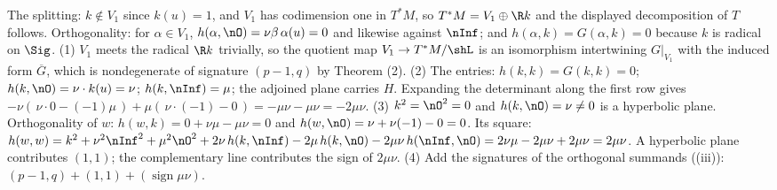 The splitting: $k \notin V_1$ since $k(u) = 1$, and $V_1$ has codimension one in $T^*M$, so $T^*M = V_1 \oplus \R k$ and the displayed decomposition of $T$ follows. Orthogonality: for $\alpha \in V_1$, $h(\alpha, \nO) = \nu\beta\,\alpha(u) = 0$ and likewise against $\nInf$; and $h(\alpha, k) = G(\alpha, k) = 0$ because $k$ is radical on $\Sig$. (1) $V_1$ meets the radical $\R k$ trivially, so the quotient map $V_1 \to T^*M/\shL$ is an isomorphism intertwining $G|_{V_1}$ with the induced form $\overline{G}$, which is nondegenerate of signature $(p{-}1,q)$ by Theorem (2). (2) The entries: $h(k,k) = G(k,k) = 0$; $h(k, \nO) = \nu \cdot k(u) = \nu$; $h(k, \nInf) = \mu$; the adjoined plane carries $H$. Expanding the determinant along the first row gives $-\nu(\,\nu \cdot 0 - (-1)\mu\,) + \mu(\,\nu \cdot (-1) - 0\,) = -\mu\nu - \mu\nu = -2\mu\nu$. (3) $k^2 = \nO^2 = 0$ and $h(k, \nO) = \nu \neq 0$ is a hyperbolic plane. Orthogonality of $w$: $h(w, k) = 0 + \nu\mu - \mu\nu = 0$ and $h(w, \nO) = \nu + \nu(-1) - 0 = 0$. Its square: $h(w,w) = k^2 + \nu^2 \nInf^2 + \mu^2 \nO^2 + 2\nu\,h(k,\nInf) - 2\mu\,h(k,\nO) - 2\mu\nu\,h(\nInf,\nO) = 2\nu\mu - 2\mu\nu + 2\mu\nu = 2\mu\nu$. A hyperbolic plane contributes $(1,1)$; the complementary line contributes the sign of $2\mu\nu$. (4) Add the signatures of the orthogonal summands ((iii)): $(p{-}1, q) + (1,1) + (\operatorname{sign} \mu\nu)$.
